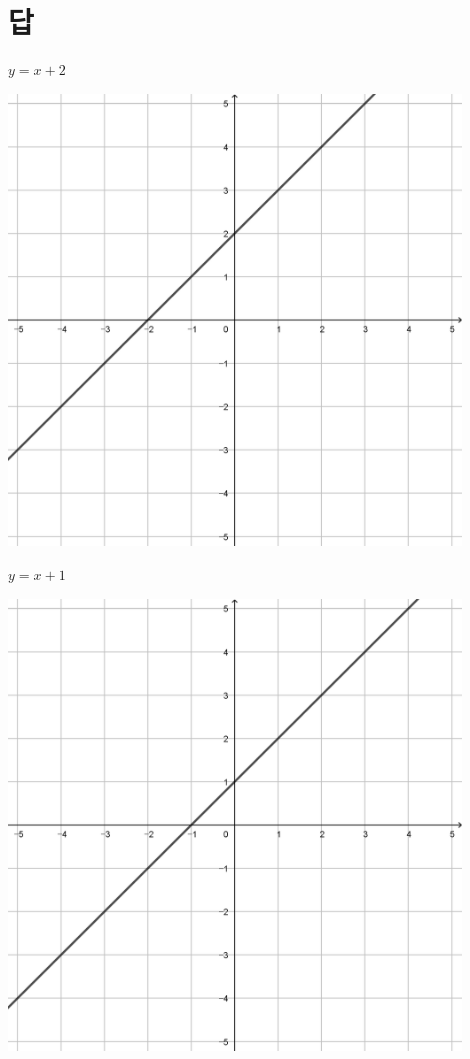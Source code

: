 \documentclass[a4paper]{oblivoir}
\let\oldsection\section
\renewcommand\section{\clearpage\oldsection}
\begin{document}
\section*{답}

\begin{minipage}{0.45\textwidth}\centering
\(y=x+2\)
\par\bigskip\includegraphics[width=0.9\textwidth]{img/1_line_1}
\end{minipage}
\begin{minipage}{0.45\textwidth}\centering
\(y=x+1\)
\par\bigskip\includegraphics[width=0.9\textwidth]{img/1_line_2}
\end{minipage}\bigskip\bigskip\par
\end{document}
